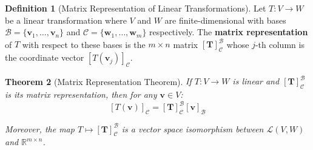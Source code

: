 \documentclass[12pt]{article}
\numberwithin{equation}{section}
\newcommand{\vect}[1]{\boldsymbol{#1}}   %
\newcommand{\mat}[1]{\mathbf{#1}}        %
\theoremstyle{plain}
\newtheorem{theorem}{Theorem}[section]
\theoremstyle{definition}
\newtheorem{definition}[theorem]{Definition}
\theoremstyle{remark}
\begin{document}
\begin{definition}[Matrix Representation of Linear Transformations]
Let $T: V \to W$ be a linear transformation where $V$ and $W$ are finite-dimensional with bases $\mathcal{B} = \{\vect{v}_1, \ldots, \vect{v}_n\}$ and $\mathcal{C} = \{\vect{w}_1, \ldots, \vect{w}_m\}$ respectively. The \textbf{matrix representation} of $T$ with respect to these bases is the $m \times n$ matrix $[\mat{T}]_{\mathcal{C}}^{\mathcal{B}}$ whose $j$-th column is the coordinate vector $[T(\vect{v}_j)]_{\mathcal{C}}$.
\end{definition}

\begin{theorem}[Matrix Representation Theorem]
If $T: V \to W$ is linear and $[\mat{T}]_{\mathcal{C}}^{\mathcal{B}}$ is its matrix representation, then for any $\vect{v} \in V$:
$$[T(\vect{v})]_{\mathcal{C}} = [\mat{T}]_{\mathcal{C}}^{\mathcal{B}} [\vect{v}]_{\mathcal{B}}$$

Moreover, the map $T \mapsto [\mat{T}]_{\mathcal{C}}^{\mathcal{B}}$ is a vector space isomorphism between $\mathcal{L}(V, W)$ and $\mathbb{R}^{m \times n}$.
\end{theorem}
\end{document}
